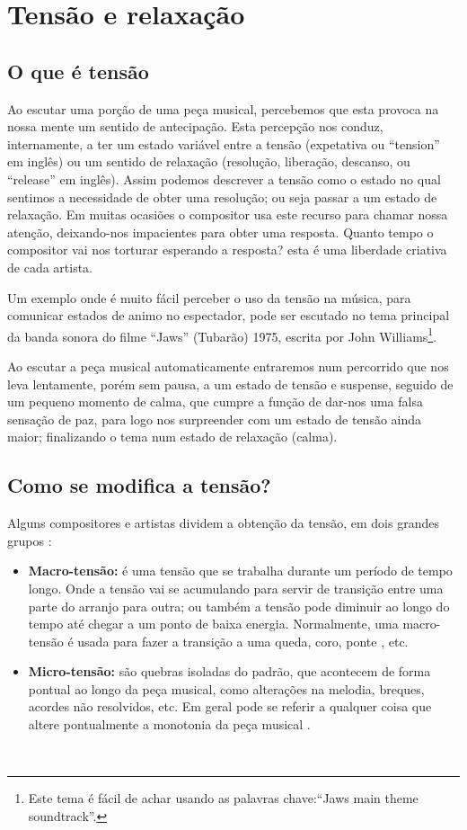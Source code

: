 \section{Tensão e relaxação }
\label{sec:tensionrelease}

\subsection{O que é tensão}
Ao escutar uma porção de uma peça musical, percebemos que esta provoca na nossa mente
um sentido de antecipação.
Esta percepção nos conduz, internamente, 
a ter um estado variável entre a tensão (expetativa ou ``tension'' em inglês)
ou um sentido de relaxação (resolução, liberação, descanso, ou ``release'' em inglês).
Assim podemos descrever a tensão como o 
estado no qual sentimos a necessidade de obter uma resolução; ou seja passar a um estado de relaxação.
Em muitas ocasiões o compositor usa este recurso para chamar nossa atenção,
deixando-nos impacientes para obter uma resposta. 
Quanto tempo o compositor vai nos torturar esperando a resposta? 
esta é uma liberdade criativa de cada artista.

\begin{example}
Um exemplo onde é muito fácil perceber o uso da tensão na música, 
para comunicar estados de animo no espectador, 
pode ser escutado no tema principal da banda sonora do filme ``Jaws'' (Tubarão) 1975,
escrita por John Williams\footnote{Este tema é fácil de achar usando as palavras chave:``Jaws main theme soundtrack''.}.

Ao escutar a peça musical automaticamente entraremos num percorrido que nos leva lentamente,
porém sem pausa, a um estado de tensão e suspense, seguido de um pequeno momento de calma,
que cumpre a função de dar-nos uma falsa sensação de paz,
 para logo nos surpreender com um estado de tensão ainda maior;
finalizando o tema num estado de relaxação (calma).
\end{example}

\subsection{Como se modifica a tensão?}

Alguns compositores e artistas dividem a obtenção da tensão, em dois grandes grupos \cite{edmtensionrelease1}:
\begin{itemize}
\item \textbf{Macro-tensão:}
é uma tensão que se trabalha durante um período de tempo longo. 
Onde a tensão vai se acumulando para servir de transição entre uma parte do arranjo para outra;
ou também a tensão pode diminuir ao longo do tempo até chegar a um ponto de baixa energia.
Normalmente, uma macro-tensão é usada para fazer a transição a uma queda, coro, ponte \cite{edmtensionrelease1}, etc.
\item \textbf{Micro-tensão:}
são  quebras isoladas do padrão, que acontecem de forma pontual ao longo da peça musical, 
como alterações na melodia, breques, acordes não resolvidos, etc. 
Em geral pode se referir a qualquer coisa que altere pontualmente a monotonia da peça musical \cite{edmtensionrelease1}.
\end{itemize}~

